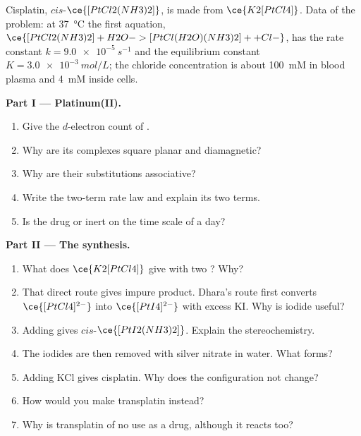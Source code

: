 \begin{problem}
\label{pb:b3:complex-mechanisms:1}
Cisplatin, $cis$-$\ce{[PtCl2(NH3)2]}$, is made from $\ce{K2[PtCl4]}$. Data of the problem: at
\qty{37}{\celsius} the first aquation, $\ce{[PtCl2(NH3)2] + H2O -> [PtCl(H2O)(NH3)2]+ + Cl-}$, has the
rate constant $k = \qty{9.0e-5}{s^{-1}}$ and the equilibrium constant $K = \qty{3.0e-3}{mol/L}$; the
chloride concentration is about \qty{100}{mM} in blood plasma and \qty{4}{mM} inside cells.

\medskip\noindent\textbf{Part I --- Platinum(II).}
\begin{enumerate}
  \item Give the $d$-electron count of .
  \item Why are its complexes square planar and diamagnetic?
  \item Why are their substitutions associative?
  \item Write the two-term rate law and explain its two terms.
  \item Is the drug  or inert on the time scale of a day?
\end{enumerate}

\medskip\noindent\textbf{Part II --- The synthesis.}
\begin{enumerate}[resume]
  \item What does $\ce{K2[PtCl4]}$ give with two ? Why?
  \item That direct route gives impure product. Dhara's route first converts
        $\ce{[PtCl4]^{2-}}$ into $\ce{[PtI4]^{2-}}$ with excess KI. Why is iodide useful?
  \item Adding  gives $cis$-$\ce{[PtI2(NH3)2]}$. Explain the stereochemistry.
  \item The iodides are then removed with silver nitrate in water. What forms?
  \item Adding KCl gives cisplatin. Why does the configuration not change?
  \item How would you make transplatin instead?
  \item Why is transplatin of no use as a drug, although it reacts too?
\end{enumerate}


\end{problem}
